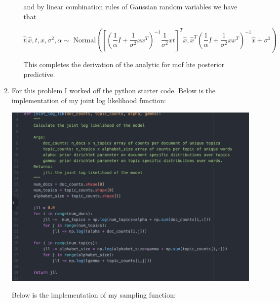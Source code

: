 \documentclass[11pt]{article}
\theoremstyle{definition}
\begin{document}
\begin{enumerate}
\begin{itemize}
and by linear combination rules of Gaussian random variables we have that

$$\hat{t} | \hat{x}, t,x,\sigma^2,\alpha \sim \text{ Normal}([(\frac{1}{\alpha}I+\frac{1}{\sigma^2}xx^T)^{-1}\frac{1}{\sigma^2}xt]^T\hat{x}, \hat{x}^T(\frac{1}{\alpha}I+\frac{1}{\sigma^2}xx^T)^{-1}\hat{x}+\sigma^2)$$

This completes the derivation of the analytic for mof hte posterior predictive.

\end{itemize}

\item For this problem I worked off the python starter code. Below is the implementation of my joint log likelihood function:

\begin{center}
\includegraphics[scale=0.4]{figures/jll}
\end{center}

Below is the implementation of my sampling function:


\end{enumerate}
\end{document}
